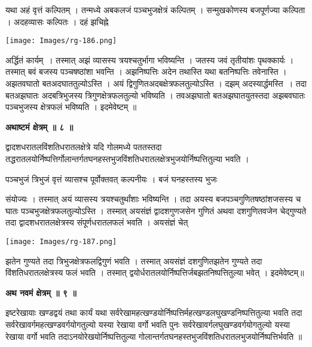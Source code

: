 \documentclass[11pt, openany]{book}
\begin{document}
यथा अहं वृत्तं कल्पितम् । तन्मध्ये अबकलजं पञ्चभुजक्षेत्रं
कल्पितम् । 
सन्मुखकोणस्य बजपूर्णज्या कल्पिता । अदहव्यासः कल्पितः । दहं झचिह्ने
\begin{center}
\texttt{[image: Images/rg-186.png]}  
\end{center}
अर्द्धितं कार्यम्~। तस्मात् अझं व्यासस्य त्रयश्चतुर्भागा भविष्यन्ति । जतस्य जवं
तृतीयांशः पृथक्कार्यः । तस्मात् बवं बजस्य पञ्चषष्ठांशा भवन्ति । अझनिष्पत्तिः अदेन 
तथास्ति यथा बतनिष्पत्तिः तवेनास्ति । अझतवघातो बतअदघाततुल्योऽस्ति । अयं द्विगुणितअदबक्षेत्रफलतुल्योऽस्ति । दझम् अदस्यार्द्धमस्ति~। तदा बतअझघातः अदबत्रिभुजस्य त्रिगुणक्षेत्रफलतुल्यो भविष्यति । तवअझघातो बतअझघातयुतस्तदा अझबवघातः पञ्चभुजस्य क्षेत्रफलं भविष्यति । इदमेवेष्टम् ॥\\
\begin{center}
\textbf{\large अथाष्टमं क्षेत्रम् ॥ ८ ॥ }
\end{center}
\vspace{2mm}

{\ab द्वादशधरातलविंशतिधरातलक्षेत्रे यदि गोलमध्ये पततस्तदा तद्धरातलयोर्निष्पत्तिर्गोलान्तर्गतघनहस्तभुजविंशतिधरातलक्षेत्रभुजयोर्निष्पत्तितुल्या भवति । }\\
\vspace{5mm}

पञ्चभुजं त्रिभुजं वृत्तं व्यासश्च पूर्वोक्तवत् कल्पनीयः । बजं घनहस्तस्य  भुजः
\begin{vwcol}[widths={0.7,0.3}, sep=.8cm, rule=0pt]
 संयोज्यः । तस्मात् अयं व्यासस्य त्रयश्चतुर्थांशाः भविष्यन्ति । तदा अयस्य बजपञ्चगुणितषष्ठांशजसस्य च घातः पञ्चभुजक्षेत्रफलतुल्योऽस्ति । तस्मात् अयसंज्ञं द्वादशगुणजसेन गुणितं अथवा दशगुणितवजेन चेद्गुण्यते तदा द्वादशधरातलक्षेत्रस्य संपूर्णधरातलफलं भवति । अयसंज्ञं चेत्\\
 \vspace{5mm}
 
\noindent \texttt{[image: Images/rg-187.png]}  
\end{vwcol}

\newpage
\noindent झतेन गुण्यते तदा त्रिभुजक्षेत्रफलद्विगुणं भवति । तस्मात् अयसंज्ञं दशगुणितझतेन गुण्यते तदा विंशतिधरातलक्षेत्रस्य फलं भवति । तस्मात् द्वयोर्धरातलयोर्निष्पत्तिर्जबझतनिष्पत्तितुल्या भवेत् । इदमेवेष्टम्॥\\
\begin{center}
\textbf{\large अथ नवमं क्षेत्रम् ॥ ९ ॥ }
\end{center}
\vspace{2mm}

{\ab इष्टरेखायाः खण्डद्वयं तथा कार्यं यथा सर्वरेखामहत्खण्डयोर्निष्पत्तिर्महत्खण्डलघुखण्डनिष्पत्तितुल्या भवति तदा  सर्वरेखावर्गमहत्खण्डवर्गयोगतुल्यो यस्या रेखाया वर्गो भवति  पुनः सर्वरेखावर्गलघुखण्डवर्गयोगतुल्यो यस्या रेखाया वर्गो  भवति तदाऽनयोरेखयोर्निष्पत्तितुल्या गोलान्तर्गतघनहस्तभुजविंशतिधरातलभुजयोर्निष्पत्तिर्भवति ॥ }\\
\vspace{5mm}
\end{document}
